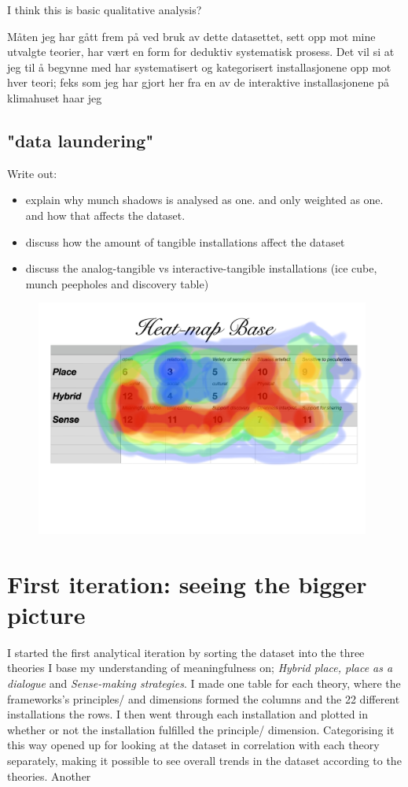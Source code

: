 I think this is basic qualitative analysis?

Måten jeg har gått frem på ved bruk av dette datasettet, sett opp mot mine utvalgte teorier, har vært en form for deduktiv systematisk prosess. Det vil si at jeg til å begynne med har systematisert og kategorisert installasjonene opp mot hver teori; feks som jeg har gjort her fra en av de interaktive installasjonene på klimahuset haar jeg

\subsection{"data laundering"}
Write out:
\begin{itemize}
    \item explain why munch shadows is analysed as one. and only weighted as one. and how that affects the dataset.
    \item discuss how the amount of tangible installations affect the dataset
    \item discuss the analog-tangible vs interactive-tangible installations (ice cube, munch peepholes and discovery table)
\end{itemize}

\begin{figure}[H]
\includegraphics[width=11cm]{pictures/dataset/heatmap.jpg}
\centering 
\end{figure}


\section{First iteration: seeing the bigger picture}

I started the first analytical iteration by sorting the dataset into the three theories I base my understanding of meaningfulness on; \emph{Hybrid place, place as a dialogue} and \emph{Sense-making strategies}. I made one table for each theory, where the frameworks's principles/ and dimensions formed the columns and the 22 different installations the rows. I then went through each installation and plotted in whether or not the installation fulfilled the principle/ dimension. Categorising it this way opened up for looking at the dataset in correlation with each theory separately, making it possible to see overall trends in the dataset according to the theories. Another



